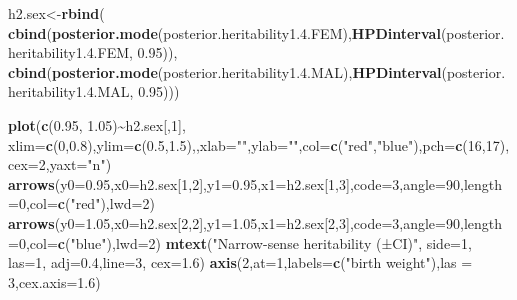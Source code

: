 \documentclass[
  12pt,
]{book}
\newenvironment{Shaded}{\begin{snugshade}}{\end{snugshade}}
\newcommand{\DataTypeTok}[1]{\textcolor[rgb]{0.13,0.29,0.53}{#1}}
\newcommand{\DecValTok}[1]{\textcolor[rgb]{0.00,0.00,0.81}{#1}}
\newcommand{\FloatTok}[1]{\textcolor[rgb]{0.00,0.00,0.81}{#1}}
\newcommand{\KeywordTok}[1]{\textcolor[rgb]{0.13,0.29,0.53}{\textbf{#1}}}
\newcommand{\NormalTok}[1]{#1}
\newcommand{\OperatorTok}[1]{\textcolor[rgb]{0.81,0.36,0.00}{\textbf{#1}}}
\newcommand{\StringTok}[1]{\textcolor[rgb]{0.31,0.60,0.02}{#1}}
\begin{document}
\begin{Shaded}
\begin{Highlighting}[]
\NormalTok{h2.sex\textless{}{-}}\KeywordTok{rbind}\NormalTok{(}
\KeywordTok{cbind}\NormalTok{(}\KeywordTok{posterior.mode}\NormalTok{(posterior.heritability1.}\FloatTok{4.}\NormalTok{FEM),}\KeywordTok{HPDinterval}\NormalTok{(posterior.heritability1.}\FloatTok{4.}\NormalTok{FEM, }\FloatTok{0.95}\NormalTok{)),}
\KeywordTok{cbind}\NormalTok{(}\KeywordTok{posterior.mode}\NormalTok{(posterior.heritability1.}\FloatTok{4.}\NormalTok{MAL),}\KeywordTok{HPDinterval}\NormalTok{(posterior.heritability1.}\FloatTok{4.}\NormalTok{MAL, }\FloatTok{0.95}\NormalTok{)))}


\KeywordTok{plot}\NormalTok{(}\KeywordTok{c}\NormalTok{(}\FloatTok{0.95}\NormalTok{, }\FloatTok{1.05}\NormalTok{)}\OperatorTok{\textasciitilde{}}\NormalTok{h2.sex[,}\DecValTok{1}\NormalTok{], }\DataTypeTok{xlim=}\KeywordTok{c}\NormalTok{(}\DecValTok{0}\NormalTok{,}\FloatTok{0.8}\NormalTok{),}\DataTypeTok{ylim=}\KeywordTok{c}\NormalTok{(}\FloatTok{0.5}\NormalTok{,}\FloatTok{1.5}\NormalTok{),,}\DataTypeTok{xlab=}\StringTok{""}\NormalTok{,}\DataTypeTok{ylab=}\StringTok{""}\NormalTok{,}\DataTypeTok{col=}\KeywordTok{c}\NormalTok{(}\StringTok{"red"}\NormalTok{,}\StringTok{"blue"}\NormalTok{),}\DataTypeTok{pch=}\KeywordTok{c}\NormalTok{(}\DecValTok{16}\NormalTok{,}\DecValTok{17}\NormalTok{),}\DataTypeTok{cex=}\DecValTok{2}\NormalTok{,}\DataTypeTok{yaxt=}\StringTok{"n"}\NormalTok{)}
\KeywordTok{arrows}\NormalTok{(}\DataTypeTok{y0=}\FloatTok{0.95}\NormalTok{,}\DataTypeTok{x0=}\NormalTok{h2.sex[}\DecValTok{1}\NormalTok{,}\DecValTok{2}\NormalTok{],}\DataTypeTok{y1=}\FloatTok{0.95}\NormalTok{,}\DataTypeTok{x1=}\NormalTok{h2.sex[}\DecValTok{1}\NormalTok{,}\DecValTok{3}\NormalTok{],}\DataTypeTok{code=}\DecValTok{3}\NormalTok{,}\DataTypeTok{angle=}\DecValTok{90}\NormalTok{,}\DataTypeTok{length=}\DecValTok{0}\NormalTok{,}\DataTypeTok{col=}\KeywordTok{c}\NormalTok{(}\StringTok{"red"}\NormalTok{),}\DataTypeTok{lwd=}\DecValTok{2}\NormalTok{)}
\KeywordTok{arrows}\NormalTok{(}\DataTypeTok{y0=}\FloatTok{1.05}\NormalTok{,}\DataTypeTok{x0=}\NormalTok{h2.sex[}\DecValTok{2}\NormalTok{,}\DecValTok{2}\NormalTok{],}\DataTypeTok{y1=}\FloatTok{1.05}\NormalTok{,}\DataTypeTok{x1=}\NormalTok{h2.sex[}\DecValTok{2}\NormalTok{,}\DecValTok{3}\NormalTok{],}\DataTypeTok{code=}\DecValTok{3}\NormalTok{,}\DataTypeTok{angle=}\DecValTok{90}\NormalTok{,}\DataTypeTok{length=}\DecValTok{0}\NormalTok{,}\DataTypeTok{col=}\KeywordTok{c}\NormalTok{(}\StringTok{"blue"}\NormalTok{),}\DataTypeTok{lwd=}\DecValTok{2}\NormalTok{)}
\KeywordTok{mtext}\NormalTok{(}\StringTok{"Narrow{-}sense heritability (±CI)"}\NormalTok{, }\DataTypeTok{side=}\DecValTok{1}\NormalTok{, }\DataTypeTok{las=}\DecValTok{1}\NormalTok{, }\DataTypeTok{adj=}\FloatTok{0.4}\NormalTok{,}\DataTypeTok{line=}\DecValTok{3}\NormalTok{, }\DataTypeTok{cex=}\FloatTok{1.6}\NormalTok{)}
\KeywordTok{axis}\NormalTok{(}\DecValTok{2}\NormalTok{,}\DataTypeTok{at=}\DecValTok{1}\NormalTok{,}\DataTypeTok{labels=}\KeywordTok{c}\NormalTok{(}\StringTok{"birth weight"}\NormalTok{),}\DataTypeTok{las =} \DecValTok{3}\NormalTok{,}\DataTypeTok{cex.axis=}\FloatTok{1.6}\NormalTok{)}
\end{Highlighting}
\end{Shaded}
\end{document}

